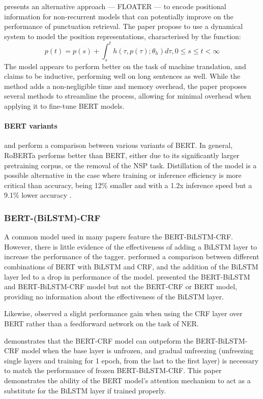 \documentclass[a4paper]{article}
\begin{document}
\begin{multicols}{2}
\cite{floater} presents an alternative approach --- FLOATER --- to encode positional information for non-recurrent models that can potentially improve on the performance of punctuation retrieval. The paper propose to use a dynamical system to model the position representations, characterised by the function: \[p(t)=p(s)+\int_s^t{ h(\tau,p(\tau);\theta_h)d\tau}, 0\leq s \leq t < \infty\]
The model appears to perform better on the task of machine translation, and claims to be inductive, performing well on long sentences as well. While the method adds a non-negligible time and memory overhead, the paper proposes several methods to streamline the process, allowing for minimal overhead when applying it to fine-tune BERT models.

\paragraph{BERT variants}
\cite{medicalasr} and \cite{efficientbertrobust} perform a comparison between various variants of BERT. In general, RoBERTa performs better than BERT, either due to its significantly larger pretraining corpus, or the removal of the NSP task. Distillation of the model is a possible alternative in the case where training or inference efficiency is more critical than accuracy, being 12\% smaller and with a 1.2x inference speed but a 9.1\% lower accuracy \citep{efficientbertrobust}.

\subsubsection{BERT-(BiLSTM)-CRF}
A common model used in many papers feature the BERT-BiLSTM-CRF. However, there is little evidence of the effectiveness of adding a BiLSTM layer to increase the performance of the tagger. \cite{bertcrf} performed a comparison between different combinations of BERT with BiLSTM and CRF, and the addition of the BiLSTM layer led to a drop in performance of the model. \cite{chinesebertbilstm} presented the BERT-BiLSTM and BERT-BiLSTM-CRF model but not the BERT-CRF or BERT model, providing no information about the effectiveness of the BiLSTM layer.

Likewise, \citet{rosvall2019comparison} observed a slight performance gain when using the CRF layer over BERT rather than a feedforward network on the task of NER.

\citet{tuneornottotune} demonstrates that the BERT-CRF model can outpeform the BERT-BiLSTM-CRF model when the base layer is unfrozen, and gradual unfreezing (unfreezing single layers and training for 1 epoch, from the last to the first layer) is necessary to match the performance of frozen BERT-BiLSTM-CRF. This paper demonstrates the ability of the BERT model's attention mechanism to act as a substitute for the BiLSTM layer if trained properly.


\end{multicols}
\end{document}
